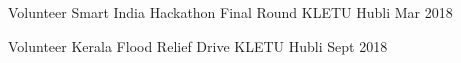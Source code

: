 

\begin{cvhonors}


\cvhonor
{Volunteer} %
{Smart India Hackathon Final Round} %
{KLETU Hubli} %
{Mar 2018} %


\cvhonor
{Volunteer} %
{Kerala Flood Relief Drive} %
{KLETU Hubli} %
{Sept 2018} %


\end{cvhonors}
